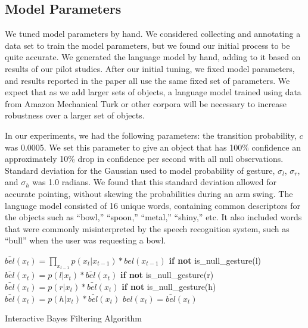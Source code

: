 \documentclass[letterpaper, 10 pt, conference]{ieeeconf}
\begin{document}
\subsection{Model Parameters}
We tuned model parameters by hand.  We considered collecting and
annotating a data set to train the model parameters, but we found our
initial process to be quite accurate. We generated the language model
by hand, adding to it based on results of our pilot
studies. After our initial tuning, we fixed
  model parameters, and results reported in the paper all use the same
  fixed set of parameters. We expect that as we add
larger sets of objects, a language model trained using data from
Amazon Mechanical Turk or other corpora will be necessary to increase
robustness over a larger set of objects.  

In our experiments, we had the following parameters: the transition
probability, $c$ was 0.0005. We set this parameter to give an object
that has 100\% confidence an approximately 10\% drop in confidence per
second with all null observations.  Standard deviation for the
Gaussian used to model probability of gesture, $\sigma_l$, $\sigma_r$,
and $\sigma_h$ was 1.0 radians. We found that this standard deviation
allowed for accurate pointing, without skewing the probabilities
during an arm swing.  The language model consisted of 16 unique words,
containing common descriptors for the objects such as ``bowl,''
``spoon,'' ``metal,'' ``shiny,'' etc. It also included words that were
commonly misinterpreted by the speech recognition system, such as
``bull'' when the user was requesting a bowl.


\begin{algorithm}
    \DontPrintSemicolon
    \BlankLine
    \BlankLine
     {
      $\bar{bel}(x_t) = \displaystyle\prod_{x_{t-1}} p(x_t|x_{t-1})*bel(x_{t-1})$
      \BlankLine
      \textbf{if not} is\_null\_gesture(l)
      \BlankLine
      \Indp$\bar{bel}(x_t) = p(l | x_t) *  \bar{bel}(x_t)$
      \BlankLine
      \Indm\textbf{if not} is\_null\_gesture(r)
      \BlankLine
      \Indp$\bar{bel}(x_t) = p(r | x_t) *  \bar{bel}(x_t)$
      \BlankLine
      \Indm\textbf{if not} is\_null\_gesture(h)
      \BlankLine
      \Indp$\bar{bel}(x_t) = p(h | x_t) *  \bar{bel}(x_t)$
      \BlankLine
      \Indm{}
      $bel(x_t) = \bar{bel}(x_t)$

    }
    \BlankLine
\caption{Interactive Bayes Filtering Algorithm} 
\label{alg:algorithm}
\end{algorithm}
\end{document}
